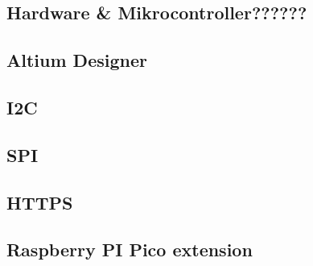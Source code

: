 \begin{inhalt}
\renewcommand*\chapterpagestyle{scrheadings}
 \section{Hardware \& Mikrocontroller??????}
\subsection{Altium Designer}
\subsection{I2C}
\subsection{SPI}
\subsection{HTTPS}
\subsection{Raspberry PI Pico extension}




\end{inhalt}